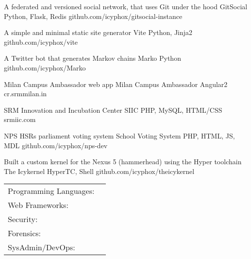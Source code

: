\documentclass[]{awesome-cv}
\begin{document}
\vspace{-2mm}
\begin{cventries}
	\cventry
	{A federated and versioned social network, that uses Git under the hood}
	{GitSocial}
	{Python, Flask, Redis}
	{github.com/icyphox/gitsocial-instance}
	{}

	\vspace{-5mm}
	\cventry
	{A simple and minimal static site generator}
	{Vite}
	{Python, Jinja2}
	{github.com/icyphox/vite}
	{}

	\vspace{-5mm}
	\cventry
	{A Twitter bot that generates Markov chains}
	{Marko}
	{Python}
	{github.com/icyphox/Marko}
	{}
	
	\vspace{-5mm}
	\cventry
	{Milan Campus Ambassador web app}
	{Milan Campus Ambassador}
	{Angular2}
	{cr.srmmilan.in}
	{}
	
	\vspace{-5mm}
	\cventry
	{SRM Innovation and Incubation Center}
	{SIIC}
	{PHP, MySQL, HTML/CSS}
	{srmiic.com}
	{}
	
	\vspace{-5mm}
	\cventry
	{NPS HSR\textquotesingle{}s parliament voting system}
	{School Voting System}
	{PHP, HTML, JS, MDL}
	{github.com/icyphox/nps-dev}
	{}

	\vspace{-5mm}
	\cventry
	{Built a custom kernel for the Nexus 5 (hammerhead) using the Hyper toolchain}
	{The Icykernel}
	{HyperTC, Shell}
	{github.com/icyphox/theicykernel}
	{}
	
	\vspace{-5mm}
\end{cventries}
\begin{cventries}
	\cventry
	{}
	{\def\arraystretch{1.15}{\begin{tabular}{ l l }
		Programming Languages:  & {\skill{ Python, Shell, C, JS, PHP, HTML/CSS}} \\
		Web Frameworks:  & {\skill{ Flask, Angular2, Hugo, Bootstrap, Materialize/MDL}} \\
		Security: & {\skill{ Vulnerability Assessment, Web Security, Penetration Testing, Networking }} \\
		Forensics: & {\skill{ Filesystems, Data Recovery}} \\
		SysAdmin/DevOps:  & {\skill{ Unix tools/CLI, AWS, Digital Ocean, Git, TravisCI}} \\
		\end{tabular}}}
	{}
	{}
	{}
\end{cventries}
\end{document}
